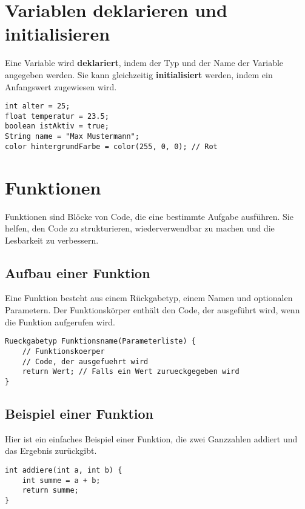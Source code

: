 \documentclass{article}
\begin{document}
\section*{Variablen deklarieren und initialisieren}

Eine Variable wird \textbf{deklariert}, indem der Typ und der Name der Variable angegeben werden. Sie kann gleichzeitig \textbf{initialisiert} werden, indem ein Anfangswert zugewiesen wird.

\begin{lstlisting}
int alter = 25;
float temperatur = 23.5;
boolean istAktiv = true;
String name = "Max Mustermann";
color hintergrundFarbe = color(255, 0, 0); // Rot
\end{lstlisting}

\section*{Funktionen}

Funktionen sind Blöcke von Code, die eine bestimmte Aufgabe ausführen. Sie helfen, den Code zu strukturieren, wiederverwendbar zu machen und die Lesbarkeit zu verbessern.

\subsection*{Aufbau einer Funktion}

Eine Funktion besteht aus einem Rückgabetyp, einem Namen und optionalen Parametern. Der Funktionskörper enthält den Code, der ausgeführt wird, wenn die Funktion aufgerufen wird.

\begin{lstlisting}
Rueckgabetyp Funktionsname(Parameterliste) {
    // Funktionskoerper
    // Code, der ausgefuehrt wird
    return Wert; // Falls ein Wert zurueckgegeben wird
}
\end{lstlisting}

\subsection*{Beispiel einer Funktion}

Hier ist ein einfaches Beispiel einer Funktion, die zwei Ganzzahlen addiert und das Ergebnis zurückgibt.

\begin{lstlisting}
int addiere(int a, int b) {
    int summe = a + b;
    return summe;
}
\end{lstlisting}
\end{document}
